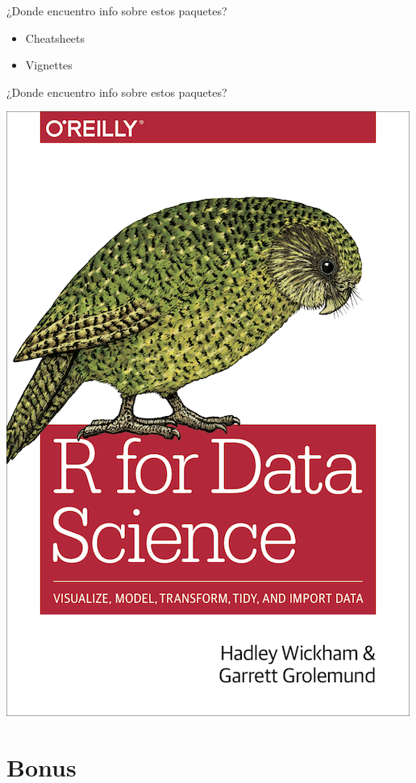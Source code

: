 \documentclass[ignorenonframetext,]{beamer}
\providecommand{\tightlist}{%
  \setlength{\itemsep}{0pt}\setlength{\parskip}{0pt}}
\begin{document}
\begin{frame}{¿Donde encuentro info sobre estos paquetes?}
\protect\hypertarget{donde-encuentro-info-sobre-estos-paquetes}{}

\begin{itemize}
\tightlist
\item
  Cheatsheets
\item
  Vignettes
\end{itemize}

\end{frame}

\begin{frame}{¿Donde encuentro info sobre estos paquetes?}
\protect\hypertarget{donde-encuentro-info-sobre-estos-paquetes-1}{}

\begin{center}\includegraphics[width=0.45\linewidth]{cover_rfordatascience} \end{center}

\end{frame}

\hypertarget{bonus}{%
\section{Bonus}\label{bonus}}
\end{document}
